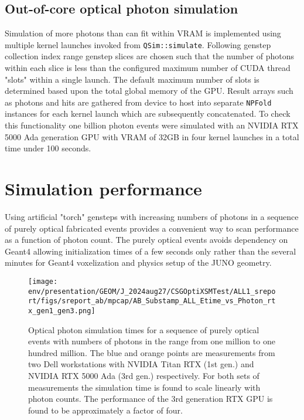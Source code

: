 \documentclass{webofc}
\begin{document}
\subsection{Out-of-core optical photon simulation}
%
Simulation of more photons than can fit within VRAM is implemented
using multiple kernel launches invoked from {\tt QSim::simulate}. 
Following genstep collection index range genstep slices are chosen 
such that the number of photons within each slice is less than 
the configured maximum number of CUDA thread "slots" within a single launch.
The default maximum number of slots is determined based upon the total
global memory of the GPU. Result arrays such as photons and hits are gathered
from device to host into separate {\tt NPFold} instances for each kernel launch 
which are subsequently concatenated. To check this functionality 
one billion photon events were simulated with an NVIDIA RTX 5000 Ada 
generation GPU with VRAM of 32GB in four kernel launches 
in a total time under 100 seconds. 
%
\section{Simulation performance}

Using artificial "torch" gensteps with increasing numbers of photons in a sequence of 
purely optical fabricated events provides a convenient way to scan performance as 
a function of photon count. The purely optical events 
avoids dependency on Geant4 allowing initialization times of a few seconds only rather than the several minutes for Geant4 
voxelization and physics setup of the JUNO geometry.  

\begin{figure}
\centering
\texttt{[image: env/presentation/GEOM/J\_2024aug27/CSGOptiXSMTest/ALL1\_sreport/figs/sreport\_ab/mpcap/AB\_Substamp\_ALL\_Etime\_vs\_Photon\_rtx\_gen1\_gen3.png]}
\caption{%
Optical photon simulation times for a sequence of purely optical events with numbers of photons 
in the range from one million to one hundred million. The blue and orange points are measurements from 
two Dell workstations with NVIDIA Titan RTX (1st gen.) and NVIDIA RTX 5000 Ada (3rd gen.) respectively.
For both sets of measurements the simulation time is found to scale linearly with photon counts. The 
performance of the 3rd generation RTX GPU is found to be approximately a factor of four.   
}
\label{scan}
\vspace{-5mm}
\end{figure}%
%
%
\end{document}
